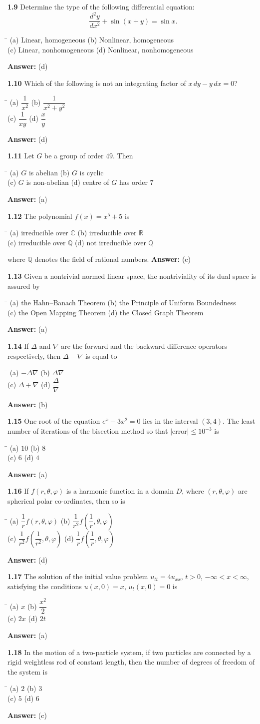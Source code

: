\documentclass[11pt,a4paper]{article}
\newcommand{\optsfour}[4]{%
  \begin{tabbing}
    \hspace{0.48\linewidth}\=\kill
    (a) #1 \> (b) #2 \\[2pt]
    (c) #3 \> (d) #4
  \end{tabbing}%
}
\newcommand{\ans}[1]{\textbf{Answer:} #1\par\medskip}
\begin{document}
\textbf{1.9} Determine the type of the following differential equation:
\[
  \frac{d^2y}{dx^2} + \sin(x + y) = \sin x.
\]
\optsfour{Linear, homogeneous}{Nonlinear, homogeneous}{Linear, nonhomogeneous}{Nonlinear, nonhomogeneous}
\ans{(d)}

\textbf{1.10} Which of the following is not an integrating factor of $x\,dy - y\,dx = 0$?
\optsfour{$\dfrac{1}{x^2}$}{$\dfrac{1}{x^2 + y^2}$}{$\dfrac{1}{xy}$}{$\dfrac{x}{y}$}
\ans{(d)}

\textbf{1.11} Let $G$ be a group of order $49$. Then
\optsfour{$G$ is abelian}{$G$ is cyclic}{$G$ is non-abelian}{centre of $G$ has order $7$}
\ans{(a)}

\textbf{1.12} The polynomial $f(x) = x^5 + 5$ is
\optsfour{irreducible over $\mathbb{C}$}{irreducible over $\mathbb{R}$}{irreducible over $\mathbb{Q}$}{not irreducible over $\mathbb{Q}$}
where $\mathbb{Q}$ denotes the field of rational numbers.
\ans{(c)}

\textbf{1.13} Given a nontrivial normed linear space, the nontriviality of its dual space is assured by
\optsfour{the Hahn--Banach Theorem}{the Principle of Uniform Boundedness}{the Open Mapping Theorem}{the Closed Graph Theorem}
\ans{(a)}

\textbf{1.14} If $\Delta$ and $\nabla$ are the forward and the backward difference operators respectively, then $\Delta - \nabla$ is equal to
\optsfour{$-\Delta\nabla$}{$\Delta\nabla$}{$\Delta + \nabla$}{$\dfrac{\Delta}{\nabla}$}
\ans{(b)}

\textbf{1.15} One root of the equation $e^x - 3x^2 = 0$ lies in the interval $(3, 4)$. The least number of iterations of the bisection method so that $|\text{error}| \le 10^{-3}$ is
\optsfour{$10$}{$8$}{$6$}{$4$}
\ans{(a)}

\textbf{1.16} If $f(r, \theta, \varphi)$ is a harmonic function in a domain $D$, where $(r, \theta, \varphi)$ are spherical polar co-ordinates, then so is
\optsfour{$\dfrac{1}{r}f(r, \theta, \varphi)$}{$\dfrac{1}{r^2}f\!\left(\dfrac{1}{r}, \theta, \varphi\right)$}{$\dfrac{1}{r^2}f\!\left(\dfrac{1}{r^2}, \theta, \varphi\right)$}{$\dfrac{1}{r}f\!\left(\dfrac{1}{r}, \theta, \varphi\right)$}
\ans{(d)}

\textbf{1.17} The solution of the initial value problem $u_{tt} = 4u_{xx}$, $t > 0$, $-\infty < x < \infty$, satisfying the conditions $u(x,0) = x$, $u_t(x,0) = 0$ is
\optsfour{$x$}{$\dfrac{x^2}{2}$}{$2x$}{$2t$}
\ans{(a)}

\textbf{1.18} In the motion of a two-particle system, if two particles are connected by a rigid weightless rod of constant length, then the number of degrees of freedom of the system is
\optsfour{$2$}{$3$}{$5$}{$6$}
\ans{(c)}
\end{document}
